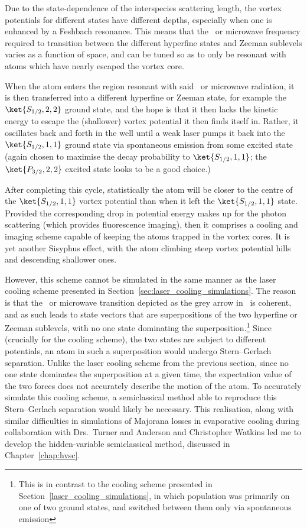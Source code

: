 Due to the state-dependence of the interspecies scattering length, the vortex potentials for different states have different depths, especially when one is enhanced by a Feshbach resonance. This means that the \rf\ or microwave frequency required to transition between the different hyperfine states and Zeeman sublevels varies as a function of space, and can be tuned so as to only be resonant with atoms which have nearly escaped the vortex core.

When the atom enters the region resonant with said \rf\ or microwave radiation, it is then transferred into a different hyperfine or Zeeman state, for example the $\ket{S_{1/2}, 2,2}$ ground state, and the hope is that it then lacks the kinetic energy to escape the (shallower) vortex potential it then finds itself in. Rather, it oscillates back and forth in the well until a weak laser pumps it back into the $\ket{S_{1/2}, 1,1}$ ground state via spontaneous emission from some excited state (again chosen to maximise the decay probability to $\ket{S_{1/2}, 1,1}$; the $\ket{P_{3/2}, 2,2}$ excited state looks to be a good choice.)

After completing this cycle, statistically the atom will be closer to the centre of the  $\ket{S_{1/2}, 1,1}$ vortex potential than when it left the $\ket{S_{1/2}, 1,1}$ state. Provided the corresponding drop in potential energy makes up for the photon scattering (which provides fluorescence imaging), then it comprises a cooling and imaging scheme capable of keeping the atoms trapped in the vortex cores. It is yet another Sisyphus effect, with the atom climbing steep vortex potential hills and descending shallower ones.

However, this scheme cannot be simulated in the same manner as the laser cooling scheme presented in Section~\ref{sec:laser_cooling_simulations}. The reason is that the \rf\ or microwave transition depicted as the grey arrow in~ is coherent, and as such leads to state vectors that are superpositions of the two hyperfine or Zeeman sublevels, with no one state dominating the superposition.\footnote{This is in contrast to the cooling scheme presented in Section~\ref{laser_cooling_simulations}, in which population was primarily on one of two ground states, and switched between them only via spontaneous emission} Since (crucially for the cooling scheme), the two states are subject to different potentials, an atom in such a superposition would undergo Stern--Gerlach separation. Unlike the laser cooling scheme from the previous section, since no one state dominates the superposition at a given time, the expectation value of the two forces does not accurately describe the motion of the atom. To accurately simulate this cooling scheme, a semiclassical method able to reproduce this Stern--Gerlach separation would likely be necessary. This realisation, along with similar difficulties in simulations of Majorana losses in evaporative cooling during collaboration with Drs.~Turner and Anderson and Christopher Watkins led me to develop the hidden-variable semiclassical method, discussed in Chapter~\ref{chap:hvsc}.

